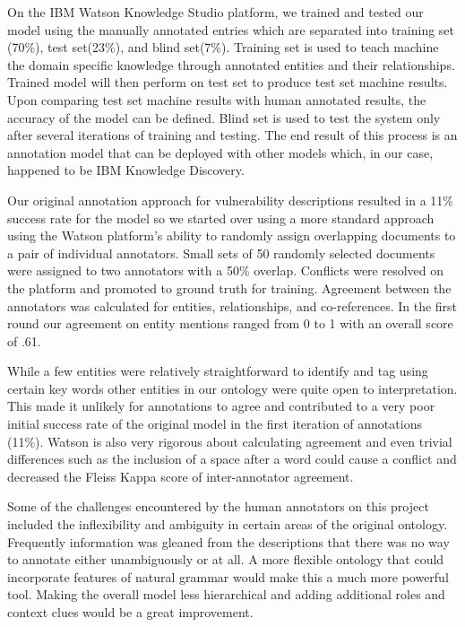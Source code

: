 \documentclass{article} %
\begin{document}
On the IBM Watson Knowledge Studio platform, we trained and tested our model using the manually annotated entries which are separated into training set (70\%), test set(23\%), and blind set(7\%). Training set is used to teach machine the domain specific knowledge through annotated entities and their relationships. Trained model will then perform on test set to produce test set machine results. Upon comparing test set machine results with human annotated results, the accuracy of the model can be defined. Blind set is used to test the system only after several iterations of training and testing. The end result of this process is an annotation model that can be deployed with other models which, in our case, happened to be IBM Knowledge Discovery.

Our original annotation approach for vulnerability descriptions resulted in a 11\% success rate for the model so we started over using a more standard approach using the Watson platform's ability to randomly assign overlapping documents to a pair of individual annotators.  Small sets of 50 randomly selected documents were assigned to two annotators with a 50\% overlap.  Conflicts were resolved on the platform and promoted to ground truth for training.  Agreement between the annotators was calculated for entities, relationships, and co-references.  In the first round our agreement on entity mentions ranged from 0 to 1 with an overall score of .61.

While a few entities were relatively straightforward to identify and tag using certain key words other entities in our ontology were quite open to interpretation.  This made it unlikely for annotations to agree and contributed to a very poor initial success rate of the original model in the first iteration of annotations (11\%).  Watson is also very rigorous about calculating agreement and even trivial differences such as the inclusion of a space after a word could cause a conflict and decreased the Fleiss Kappa score of inter-annotator agreement.  

Some of the challenges encountered by the human annotators on this project included the inflexibility and ambiguity in certain areas of the original ontology.  Frequently information was gleaned from the descriptions that there was no way to annotate either unambiguously or at all.  A more flexible ontology that could incorporate features of natural grammar would make this a much more powerful tool.  Making the overall model less hierarchical and adding additional roles and context clues would be a great improvement.
\end{document}
